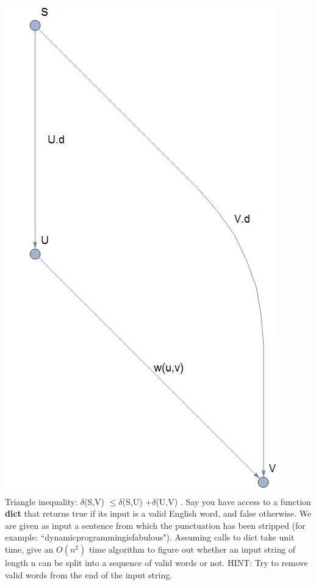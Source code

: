 \documentclass[12pt]{article}
\begin{document}
\includegraphics[scale = 0.35]{graph.jpg}\\
Triangle inequality: $\delta$(S,V) $\leq \delta$(S,U) $+ \delta$(U,V)
\newpage
{}. Say you have access to a function \textbf{dict} that returns true 
if its input is a valid English word, and false otherwise. We are given 
as input a sentence from which the punctuation has been
stripped (for example: ``dynamicprogrammingisfabulous"). 
Assuming calls to dict take unit time, give an $O(n^2)$ time 
algorithm to figure out whether an input string of length n can be
split into a sequence of valid words or not. 
HINT: Try to remove valid words from the end of the input string.
\newpage
\end{document}
